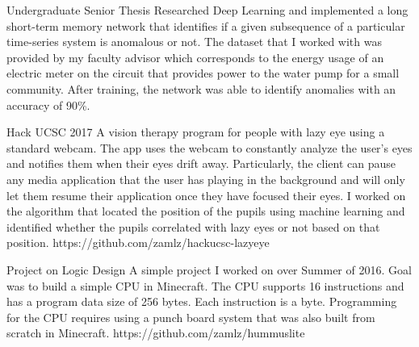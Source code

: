 \documentclass{cv}
\begin{document}
\begin{adjustwidth}{0.5cm}{0.5cm}
{Undergraduate Senior Thesis}
{Researched Deep Learning and implemented a long short-term memory
network that identifies if a given subsequence of a particular
time-series system is anomalous or not. The dataset that I worked with
was provided by my faculty advisor which corresponds to the energy usage
of an electric meter on the circuit that provides power to the water
pump for a small community. After training, the network was able to identify
anomalies with an accuracy of 90\%.}{}

{Hack UCSC 2017}
{A vision therapy program for people with lazy eye using a standard
webcam. The app uses the webcam to constantly analyze the user's eyes
and notifies them when their eyes drift away. Particularly, the client
can pause any media application that the user has playing in the
background and will only let them resume their application once they
have focused their eyes. I worked on the algorithm that located the
position of the pupils using machine learning and identified whether
the pupils correlated with lazy eyes or not based on that position.}
{https://github.com/zamlz/hackucsc-lazyeye}



{Project on Logic Design}
{A simple project I worked on over Summer of 2016. Goal was to build a simple
CPU in Minecraft. The CPU supports 16 instructions and has a program data
size of 256 bytes. Each instruction is a byte. Programming for the CPU
requires using a punch board system that was also built from scratch in
Minecraft.}
{https://github.com/zamlz/hummuslite}
\end{adjustwidth}
\end{document}
